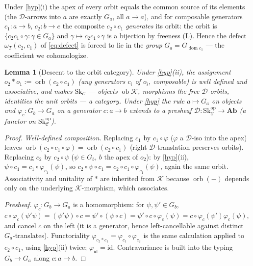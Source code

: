 \documentclass[11pt]{article}
\newtheorem{lemma}[theorem]{Lemma}
\theoremstyle{definition}
\newcommand{\id}{\mathrm{id}}
\newcommand{\C}{\mathcal{C}}
\newcommand{\D}{\mathcal{D}}
\newcommand{\K}{\mathcal{K}}
\newcommand{\Sk}{\mathrm{Sk}}
\newcommand{\Ab}{\mathbf{Ab}}
\newcommand{\ob}{\operatorname{ob}}
\newcommand{\dom}{\operatorname{dom}}
\newcommand{\orb}{\operatorname{orb}}
\newcommand{\1}{\mathbf{1}}
\begin{document}
Under \ref{hyp}(i) the apex of every orbit equals the common source of its elements
(the $\D$-arrows into $a$ are exactly $G_a$, all $a\to a$), and for composable
generators $c_1\colon a\to b$, $c_2\colon b\to e$ the composite $c_2\circ c_1$
\emph{generates} its orbit: the orbit is $\{c_2c_1\circ\gamma:\gamma\in G_a\}$ and
$\gamma\mapsto c_2c_1\circ\gamma$ is a bijection by freeness \textnormal{(L)}. Hence
the defect $\omega_T(c_2,c_1)$ of \eqref{eq:defect} is forced to lie in the
\emph{group} $G_a=G_{\dom c_1}$ --- the coefficient we cohomologize.

\begin{lemma}[Descent to the orbit category]\label{lem:skel}
Under \ref{hyp}(ii), the assignment $o_2\ast o_1:=\orb(c_2\circ c_1)$ (any
generators $c_i$ of $o_i$, composable) is well defined and associative, and makes
$\Sk_\C$ --- objects $\ob\K$, morphisms the free $\D$-orbits, identities the unit
orbits --- a category. Under \ref{hyp} the rule $a\mapsto G_a$ on objects and
$\varphi_c\colon G_b\to G_a$ on a generator $c\colon a\to b$ extends to a presheaf
$\D\colon\Sk_\C^{\mathrm{op}}\to\Ab$ (a functor on $\Sk_\C^{\mathrm{op}}$).
\end{lemma}

\begin{proof}
\emph{Well-defined composition.} Replacing $c_1$ by $c_1\circ\varphi$
($\varphi$ a $\D$-iso into the apex) leaves $\orb(c_2\circ c_1\circ\varphi)=
\orb(c_2\circ c_1)$ (right $\D$-translation preserves orbits). Replacing $c_2$ by
$c_2\circ\psi$ ($\psi\in G_b$, $b$ the apex of $o_2$): by \ref{hyp}(ii),
$\psi\circ c_1=c_1\circ\varphi_{c_1}(\psi)$, so
$c_2\circ\psi\circ c_1=c_2\circ c_1\circ\varphi_{c_1}(\psi)$, again the same orbit.
Associativity and unitality of $\ast$ are inherited from $\K$ because
$\orb(-)$ depends only on the underlying $\K$-morphism, which associates.

\emph{Presheaf.} $\varphi_c\colon G_b\to G_a$ is a homomorphism: for
$\psi,\psi'\in G_b$,
$c\circ\varphi_c(\psi'\psi)=(\psi'\psi)\circ c=\psi'\circ(\psi\circ c)
=\psi'\circ c\circ\varphi_c(\psi)=c\circ\varphi_c(\psi')\varphi_c(\psi)$, and
cancel $c$ on the left (it is a generator, hence left-cancellable against
distinct $G_a$-translates). Functoriality $\varphi_{c_2\ast c_1}=\varphi_{c_1}
\circ\varphi_{c_2}$ is the same calculation applied to $c_2\circ c_1$, using
\ref{hyp}(ii) twice; $\varphi_{\id}=\id$. Contravariance is built into the typing
$G_b\to G_a$ along $c\colon a\to b$.
\end{proof}
\end{document}
